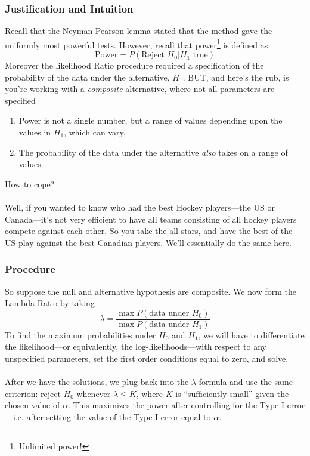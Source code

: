 \documentclass[12pt]{article}
\theoremstyle{plain}
\theoremstyle{definition}
\theoremstyle{remark}
\begin{document}
\subsubsection{Justification and Intuition}

Recall that the Neyman-Pearson lemma stated that the method gave
the uniformly most powerful tests. However, recall that power\footnote{
Unlimited power!} is defined as
   \[ \text{Power} = P(\text{Reject $H_0$} | \text{$H_1$ true}) \]
Moreover the likelihood Ratio procedure required a specification
of the probability of the data under the alternative, $H_1$. BUT,
and here's the rub, is you're working with a \emph{composite}
alternative, where not all parameters are specified
\begin{enumerate}
   \item Power is not a single number, but a range of values
      depending upon the values in $H_1$, which can vary.
   \item The probability of the data under the alternative \emph{also}
      takes on a range of values.
\end{enumerate}
How to cope?
\\
\\
Well, if you wanted to know who had the best Hockey players---the US
or Canada---it's not very efficient to have all teams consisting of
all hockey players compete against each other. So you take the
all-stars, and have the best of the US play against the best Canadian
players.  We'll essentially do the same here.

\subsubsection{Procedure}

So suppose the null and alternative hypothesis are composite.
We now form the Lambda Ratio by taking
\[ \lambda =
   \frac{\max P(\text{data under $H_0$})}{
      \max P(\text{data under $H_1$})}
   \]
To find the maximum probabilities under $H_0$ and $H_1$, we
will have to differentiate the likelihood---or equivalently, the
log-likelihoods---with respect to any unspecified parameters, set
the first order conditions equal to zero, and solve.
\\
\\
After we have the solutions, we plug back into the $\lambda$ formula
and use the same criterion:
reject $H_0$ whenever $\lambda\leq K$,
where $K$ is ``sufficiently small'' given the chosen value of $\alpha$.
This maximizes the power after controlling for the Type I error---i.e.
after setting the value of the Type I error equal to $\alpha$.
\end{document}
